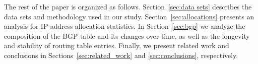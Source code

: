 The rest of the paper is organized as follows. Section~\ref{sec:data sets}
describes the data sets and methodology used in our study.
Section~\ref{sec:allocations} presents an analysis for IP address allocation
statistics. In Section~\ref{sec:bgp} we analyze the composition of the BGP
table and its changes over time, as well as the longevity and stability of
routing table entries. Finally, we present related work and conclusions in
Sections~\ref{sec:related_work} and \ref{sec:conclusions}, respectively.

%
